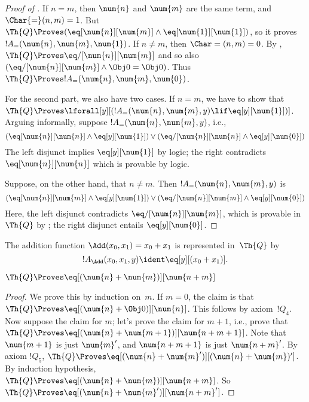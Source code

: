\documentclass[../../../include/open-logic-section]{subfiles}
\begin{document}
\begin{proof}[Proof of ]
If $n = m$, then $\num{n}$ and $\num{m}$ are the same term, and
$\Char{=}(n, m) = 1$. But $\Th{Q} \Proves (\eq[\num{n}][\num{m}] \land
\eq[\num{1}][\num{1}])$, so it proves $!A_=(\num{n}, \num{m},
\num{1})$.  If $n \neq m$, then $\Char=(n, m) = 0$. By
, $\Th{Q} \Proves \eq/[\num{n}][\num{m}]$ and
so also $(\eq/[\num{n}][\num{m}] \land \Obj 0 = \Obj 0)$. Thus $\Th{Q}
\Proves !A_=(\num{n}, \num{m}, \num{0})$.

For the second part, we also have two cases. If $n = m$, we have to
show that $\Th{Q} \Proves \lforall[y][(!A_=(\num{n}, \num{m}, y)
  \lif \eq[y][\num{1}])]$.  Arguing informally, suppose $!A_=(\num{n},
\num{m}, y)$, i.e.,
\[
(\eq[\num{n}][\num{n}] \land \eq[y][\num{1}]) \lor
(\eq/[\num{n}][\num{n}] \land \eq[y][\num{0}])
\]
The left disjunct implies $\eq[y][\num{1}]$ by logic; the right
contradicts $\eq[\num{n}][\num{n}]$ which is provable by logic.

Suppose, on the other hand, that $n \neq m$. Then $!A_=(\num{n},
\num{m}, y)$ is
\[
(\eq[\num{n}][\num{m}] \land \eq[y][\num{1}]) \lor
(\eq/[\num{n}][\num{m}] \land \eq[y][\num{0}])
\]
Here, the left disjunct contradicts $\eq/[\num{n}][\num{m}]$, which is
provable in $\Th{Q}$ by ; the right disjunct
entails $\eq[y][\num{0}]$.
\end{proof}

\begin{prop}
The addition function $\Add(x_0, x_1) = x_0+x_1$ is represented
in~$\Th{Q}$ by
\[
  !A_{\Add}(x_0, x_1, y) \ident \eq[y][(x_0 + x_1)].
\]
\end{prop}

\begin{lem}
$\Th{Q} \Proves \eq[(\num{n} + \num{m})][\num{n+m}]$
\end{lem}

\begin{proof}
We prove this by induction on~$m$. If $m = 0$, the claim is that
$\Th{Q} \Proves \eq[(\num{n} + \Obj 0)][\num{n}]$. This follows by
axiom~$!Q_4$.  Now suppose the claim for $m$; let's prove the claim
for $m+1$, i.e., prove that $\Th{Q} \Proves \eq[(\num{n} +
  \num{m+1})][\num{n+m+1}]$. Note that $\num{m+1}$ is just $\num{m}'$,
and $\num{n+m+1}$ is just $\num{n+m}'$.  By axiom $!Q_5$, $\Th{Q}
\Proves \eq[(\num{n} + \num{m}')][(\num{n}+\num{m})']$. By induction
hypothesis, $\Th{Q} \Proves \eq[(\num{n} + \num{m})][\num{n+m}]$. So
$\Th{Q} \Proves \eq[(\num{n} + \num{m}')][\num{n+m}']$.
\end{proof}
\end{document}
